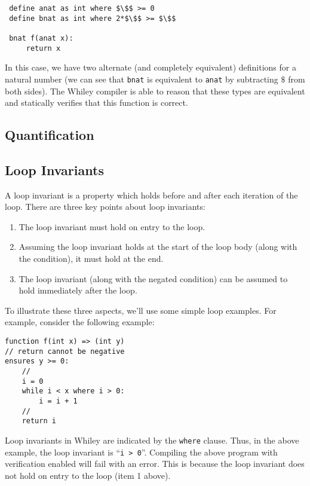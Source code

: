 \begin{lstlisting}
 define anat as int where $\$$ >= 0
 define bnat as int where 2*$\$$ >= $\$$

 bnat f(anat x):
     return x
\end{lstlisting}
In this case, we have two alternate (and completely equivalent)
definitions for a natural number (we can see that \lstinline{bnat} is
equivalent to \lstinline{anat} by subtracting $\$$ from both sides).
The Whiley compiler is able to reason that these types are equivalent
and statically verifies that this function is correct.

\subsection{Quantification}
\subsection{Loop Invariants}
\label{loop_invariants}

A loop invariant is a property which
holds before and after each iteration of the loop.  There are three
key points about loop invariants:
\begin{enumerate}
\item The loop invariant must hold on entry to the loop.
\item Assuming the loop invariant holds at the start of the loop body
  (along with the condition), it must hold at the end.
\item The loop invariant (along with the negated condition) can be
  assumed to hold immediately after the loop.
\end{enumerate}

To illustrate these three aspects, we'll use some simple loop
examples.  For example, consider the following example:

\begin{lstlisting}
function f(int x) => (int y)
// return cannot be negative
ensures y >= 0:
    //
    i = 0
    while i < x where i > 0:
        i = i + 1 
    //
    return i
\end{lstlisting}

Loop invariants in Whiley are indicated by the \lstinline{where}
clause.  Thus, in the above example, the loop invariant is
``\lstinline{i > 0}''.  Compiling the above program with verification
enabled will fail with an error.   This is because the loop invariant
does not hold on entry to the loop (item 1 above).

